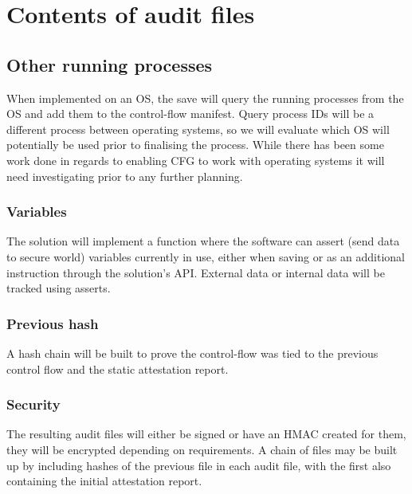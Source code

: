\section{Contents of audit files}

\subsection{Other running processes}

When implemented on an OS, the save will query the running processes from the OS and add them to the control-flow manifest. Query process IDs will be a different process between operating systems, so we will evaluate which OS will potentially be used prior to finalising the process. While there has been some work done in regards to enabling CFG to work with operating systems it will need investigating prior to any further planning.

\subsubsection{Variables}

The solution will implement a function where the software can assert (send data to secure world) variables currently in use, either when saving or as an additional instruction through the solution's API. External data or internal data will be tracked using asserts.

\subsubsection{Previous hash}

A hash chain will be built to prove the control-flow was tied to the previous control flow and the static attestation report.

\subsubsection{Security}

The resulting audit files will either be signed or have an HMAC created for them, they will be encrypted depending on requirements. A chain of files may be built up by including hashes of the previous file in each audit file, with the first also containing the initial attestation report.